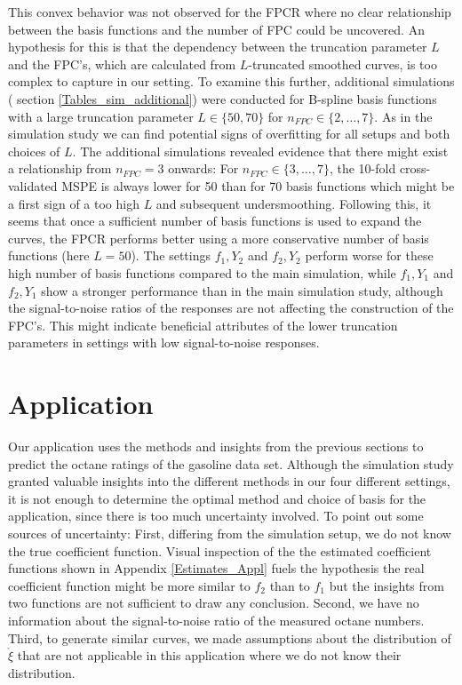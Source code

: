 \documentclass[11pt,twoside,a4paper]{article}
\begin{document}
	This convex behavior was not observed for the FPCR where no clear relationship between the basis functions and the number of FPC could be uncovered. An hypothesis for this is that the dependency between the truncation parameter $L$ and the FPC's, which are calculated from $L$-truncated smoothed curves, is too complex to capture in our setting. To examine this further, additional simulations ( section \ref{Tables_sim_additional}) were conducted for B-spline basis functions with a large truncation parameter $L \in \{50, 70\}$ for $n_{FPC} \in \{2, \dots, 7 \}$. As in the simulation study we can find potential signs of overfitting for all setups and both choices of $L$. The additional simulations revealed evidence that there might exist a relationship from $n_{FPC} = 3$ onwards: For $n_{FPC} \in \{3, \dots, 7 \}$, the 10-fold cross-validated MSPE is always lower for 50 than for 70 basis functions which might be a first sign of a too high $L$ and subsequent undersmoothing. Following this, it seems that once a sufficient number of basis functions is used to expand the curves, the FPCR performs better using a more conservative number of basis functions (here $L = 50$). The settings $f_1,Y_2$ and $f_2,Y_2$ perform worse for these high number of basis functions compared to the main simulation, while $f_1,Y_1$ and $f_2,Y_1$ show a stronger performance than in the main simulation study, although the signal-to-noise ratios of the responses are not affecting the construction of the FPC's. This might indicate beneficial attributes of the lower truncation parameters in settings with low signal-to-noise responses.
	
	


	\section{Application}\label{Application}
		Our application uses the methods and insights from the previous sections to predict the octane ratings of the  gasoline data set.
		Although the simulation study granted valuable insights into the different methods in our four different settings, it is not enough to determine the optimal method and choice of basis for the application, since there is too much uncertainty involved. To point out some sources of uncertainty: First, differing from the simulation setup, we do not know the true coefficient function. Visual inspection of the the estimated coefficient functions shown in Appendix \ref{Estimates_Appl} fuels the hypothesis the real coefficient function might be more similar to $f_2$ than to $f_1$ but the insights from two functions are not sufficient to draw any conclusion. Second, we have no information about the signal-to-noise ratio of the measured octane numbers. Third, to generate similar curves, we made assumptions about the distribution of $\mathring{\xi}$ that are not applicable in this application where we do not know their distribution.
		 
\end{document}

